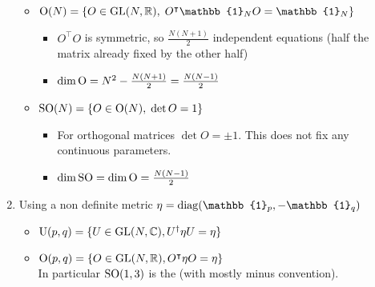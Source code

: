 \begin{enumerate}
\begin{itemize}
\item $\Ogroup(N) = \{O\in\GL(N,\R),\; O^\intercal\mathbb{1}_N O = \mathbb{1}_N\}$
\begin{itemize}
\item $O^\intercal O$ is symmetric, so $\frac{N(N+1)}{2}$ independent equations (half the matrix already fixed by the other half)
\item $\dim \operatorname{O} = N^2 - \frac{N(N+1)}{2} = \frac{N(N-1)}{2}$
\end{itemize}
\item $\operatorname{SO}(N) = \{O\in\operatorname{O}(N),\; \det O = 1\}$
\begin{itemize}
\item For orthogonal matrices $\det O = \pm 1$. This does not fix any continuous parameters.
\item $\dim \operatorname{SO} = \dim \operatorname{O} = \frac{N(N-1)}{2}$
\end{itemize}
\end{itemize}
\item Using a non definite metric $\eta = \diag(\mathbb{1}_p, -\mathbb{1}_q)$
\begin{itemize}
\item $\operatorname{U}(p,q) = \{ U\in \operatorname{GL}(N,\mathbb{C}), U^\dagger\eta U = \eta \}$
\item $\operatorname{O}(p,q) = \{ O\in \operatorname{GL}(N,\mathbb{R}), O^\intercal\eta O = \eta \}$ \\
In particular $\operatorname{SO}(1,3)$ is the  (with mostly minus convention).
\end{itemize}
\end{enumerate}

